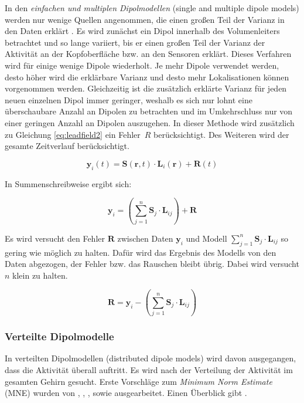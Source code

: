 \documentclass[doc,a4paper,12pt]{apa6}
\newcommand{\mx}[1]{\mathbf{#1}}
\begin{document}
In den \emph{einfachen und multiplen Dipolmodellen} (single and multiple dipole models) werden nur wenige Quellen angenommen, die einen großen Teil der Varianz in den Daten erklärt \parencite{scherg1990fundamentals}. Es wird zunächst ein Dipol innerhalb des Volumenleiters betrachtet und so lange variiert, bis er einen großen Teil der Varianz der Aktivität an der Kopfoberfläche bzw. an den Sensoren erklärt. Dieses Verfahren wird für einige wenige Dipole wiederholt. Je mehr Dipole verwendet werden, desto höher wird die erklärbare Varianz und desto mehr Lokalisationen können vorgenommen werden. Gleichzeitig ist die zusätzlich erklärte Varianz für jeden neuen einzelnen Dipol immer geringer, weshalb es sich nur lohnt eine überschaubare Anzahl an Dipolen zu betrachten und im Umkehrschluss nur von einer geringen Anzahl an Dipolen auszugehen. In dieser Methode wird zusätzlich zu Gleichung \ref{eq:leadfield2} ein Fehler~$R$ berücksichtigt. Des Weiteren wird der gesamte Zeitverlauf berücksichtigt.

\begin{equation}
\label{eq:leadfield-error}
\mx{y}_i(t) = \mx{S}(\mx{r},t) \cdot \mx{L}_i(\mx{r}) + \mx{R}(t)
\end{equation}

In Summenschreibweise ergibt sich:

\begin{equation}
\label{eq:leadfield-error-sum}
\mx{y}_i = \left( \sum_{j=1}^n \mx{S}_j \cdot \mx{L}_{ij} \right) + \mx{R}
\end{equation}

Es wird versucht den Fehler $\mx{R}$ zwischen Daten $\mx{y}_i$ und Modell $\sum_{j=1}^n \mx{S}_j \cdot \mx{L}_{ij}$ so gering wie möglich zu halten. Dafür wird das Ergebnis des Modells von den Daten abgezogen, der Fehler bzw. das Rauschen bleibt übrig. Dabei wird versucht $n$ klein zu halten.

\begin{equation}
\mx{R} = \mx{y}_i - \left( \sum_{j=1}^n \mx{S}_j \cdot \mx{L}_{ij} \right)
\end{equation}

\subsubsection{Verteilte Dipolmodelle}

In verteilten Dipolmodellen (distributed dipole models) wird davon ausgegangen, dass die Aktivität überall auftritt. Es wird nach der Verteilung der Aktivität im gesamten Gehirn gesucht. Erste Vorschläge zum \emph{Minimum Norm Estimate} (MNE) wurden von \textcite{hamalainen1984interpreting}, \textcite{ilmoniemi1985forward}, \textcite{sarvas1987basic}, sowie \textcite{hamalainen1994interpreting} ausgearbeitet. Einen Überblick gibt \textcite{hamalainen1993magnetoencephalography}.
\end{document}
